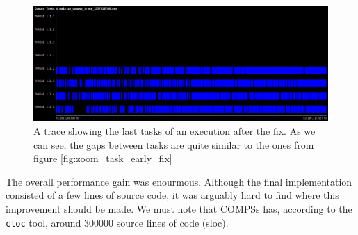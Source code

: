 \begin{figure}
\centering
\includegraphics[scale = 0.3]{figures/zoom_task_late_fix.png}
\caption{A trace showing the last tasks of an execution after the fix. As we can see, the gaps between tasks are quite similar to the ones from figure \ref{fig:zoom_task_early_fix}}
\label{fig:zoom_task_late_fix}
\end{figure}

The overall performance gain was enourmous. Although the final implementation consisted of a few lines of source code, it was arguably hard to find where this improvement should be made. We must note that COMPSs has, according to the \verb|cloc| tool, around 300000 source lines of code (sloc).
